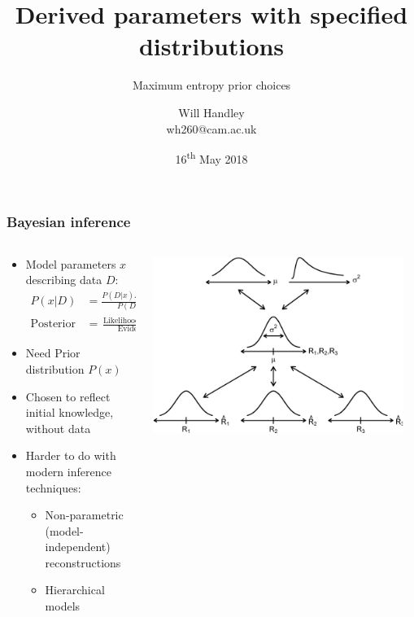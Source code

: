 \documentclass[%
]{beamer}
\title{Derived parameters with specified distributions}
\subtitle{Maximum entropy prior choices}
\author[Handley] %
{Will Handley\\ \small{wh260@cam.ac.uk}}
\institute[University of Cambridge] %
{%
Astrophysics Group \\
Cavendish Laboratory \\
University of Cambridge
}
\date{16\textsuperscript{th} May 2018}
\begin{document}
\begin{frame}
    \titlepage{}
\end{frame}

\begin{frame}
    \frametitle{Bayesian inference}
    \begin{columns}
        \begin{column}{0.6\textwidth}
            \begin{itemize}
                \item Model parameters $x$ describing data $D$:
                    \begin{align}
                        P(x|D) &= \frac{P(D|x) P(x)}{P(D)}
                        \nonumber\\
                        \text{Posterior} &= 
                        \frac{\text{Likelihood}\times \text{Prior}}{\text{Evidence}}
                        \nonumber
                    \end{align}
                \item Need Prior distribution $P(x)$
                \item Chosen to reflect initial knowledge, without data
                \item Harder to do with modern inference techniques:
                    \begin{itemize}
                        \item Non-parametric (model-independent) reconstructions
                        \item Hierarchical models
                    \end{itemize}
            \end{itemize}
        \end{column}
        \begin{column}{0.4\textwidth}
            
            \includegraphics[width=0.95\textwidth]{figures/hierarchical.pdf}
        \end{column}
    \end{columns}
\end{frame}
\end{document}
